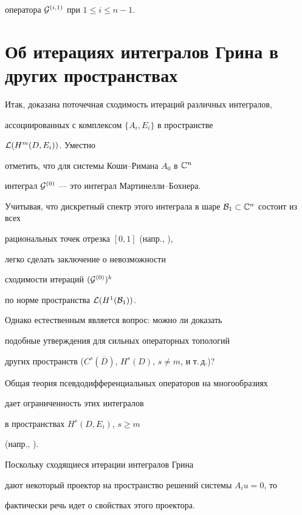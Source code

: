 оператора ${\cal G}^{(i,1)}$ при $1\leq i \leq n-1$.








\section{Об итерациях интегралов Грина в других пространствах}





Итак, доказана поточечная сходимость итераций различных интегралов,


ассоциированных с комплексом $\{ A_i , E_i \}$ в пространстве


${\cal L}(H^m (D,E_i))$. Уместно


отметить, что для системы Коши--Римана $A_0$ в ${\Bbb C}^n$


интеграл ${\cal G}^{(0)}$ --- это интеграл Мартинелли--Бохнера.


Учитывая, что дискретный спектр этого интеграла в шаре ${\cal B}_1


\subset {\Bbb C}^n$ состоит из всех


рациональных точек отрезка $[0,1]$ (напр., \cite{Ky}),


легко сделать заключение о невозможности


сходимости итераций $({\cal G}^{(0)})^k $


по норме пространства ${\cal L} (H^1 ({\cal B}_1))$.


Однако естественным является вопрос: можно ли доказать


подобные утверждения для сильных операторных топологий


других пространств ($C^s (\overline D)$, $H^s (D)$, $s\ne m$, и т.\,д.)?





Общая теория псевдодифференциальных операторов на многообразиях


дает ограниченность этих интегралов


в пространствах $H^{s} (D, E_i)$, $s\geq m$


(напр., \cite{Tark36}).


Поскольку сходящиеся итерации интегралов Грина


дают некоторый проектор на пространство решений системы $A_iu=0$, то


фактически речь идет о свойствах этого проектора.





